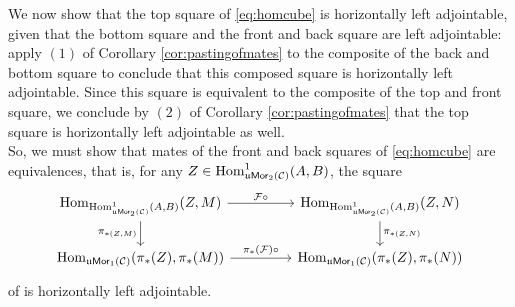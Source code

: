 \documentclass[10pt, reqno, twoside
, final
]{amsart}
\numberwithin{equation}{subsection}%
\theoremstyle{definition}
\theoremstyle{definition}
\theoremstyle{definition}
\theoremstyle{definition}
\theoremstyle{definition}
\theoremstyle{definition}
\theoremstyle{definition}
\theoremstyle{definition}
\theoremstyle{definition}
\theoremstyle{plain}
\theoremstyle{definition}
\theoremstyle{plain}
\theoremstyle{definition}
\theoremstyle{plain}
\theoremstyle{definition}
\theoremstyle{definition}
\theoremstyle{plain}
\theoremstyle{plain}
\theoremstyle{definition}
\theoremstyle{plain}
\theoremstyle{plain}
\theoremstyle{plain}
\begin{document}
We now show that the top square of \eqref{eq:homcube} is horizontally left adjointable, given that the bottom square and the front and back square are left adjointable: apply $(1)$ of Corollary \ref{cor:pastingofmates} to the composite of the back and bottom square to conclude that this composed square is horizontally left adjointable. Since this square is equivalent to the composite of the top and front square, we conclude by $(2)$ of Corollary \ref{cor:pastingofmates} that the top square is horizontally left adjointable as well. \\
So, we must show that mates of the front and back squares of \eqref{eq:homcube} are equivalences, that is, for any $Z\in\mathrm{Hom}^1_{\mathfrak{u}\mathsf{Mor}_2(\mathcal{C})}(A,B)$, the square
\begin{equation}\label{eq:homsquare}
\begin{tikzcd}
\Hom_{\Hom^1_{\umor_2(\icat)}(A,B)}(Z,M) \arrow[r,"\F\circ "] \arrow[d,"\pi_{*(Z,M)}"']  &[2em] \Hom_{\Hom^1_{\umor_2(\icat)}(A,B)}(Z,N)\arrow[d,"\pi_{*(Z,N)}"] \\
 \Hom_{\umor_1(\icat)}(\pi_*(Z),\pi_*(M)) \arrow[r,"\pi_*(\F)\circ "] &[2em] \Hom_{\umor_1(\icat)}(\pi_*(Z),\pi_*(N))
\end{tikzcd}
\end{equation}
of \infcats is horizontally left adjointable.
\end{document}
